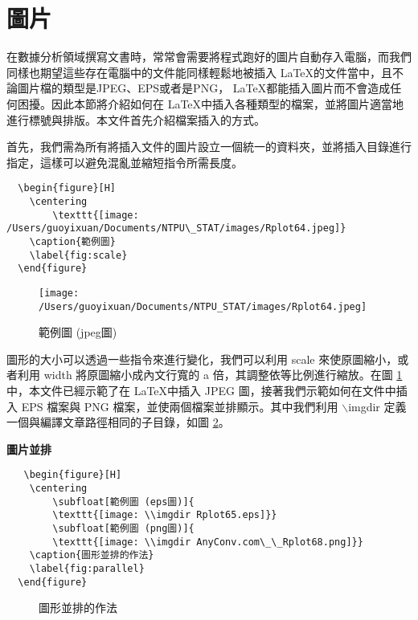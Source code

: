 \section{圖片}

在數據分析領域撰寫文書時，常常會需要將程式跑好的圖片自動存入電腦，而我們同樣也期望這些存在電腦中的文件能同樣輕鬆地被插入 \LaTeX 的文件當中，且不論圖片檔的類型是JPEG、EPS或者是PNG，  \LaTeX 都能插入圖片而不會造成任何困擾。因此本節將介紹如何在 \LaTeX 中插入各種類型的檔案，並將圖片適當地進行標號與排版。本文件首先介紹檔案插入的方式。

首先，我們需為所有將插入文件的圖片設立一個統一的資料夾，並將插入目錄進行指定，這樣可以避免混亂並縮短指令所需長度。

\bigskip
\begin{lstlisting}
  \begin{figure}[H]
    \centering
        \texttt{[image: /Users/guoyixuan/Documents/NTPU\_STAT/images/Rplot64.jpeg]}
    \caption{範例圖}
    \label{fig:scale}
  \end{figure}
\end{lstlisting}

\begin{figure}[H]
    \centering
        \texttt{[image: /Users/guoyixuan/Documents/NTPU\_STAT/images/Rplot64.jpeg]}
    \caption{範例圖 (jpeg圖)}
    \label{fig:scale}
\end{figure}

圖形的大小可以透過一些指令來進行變化，我們可以利用 scale 來使原圖縮小，或者利用 width 將原圖縮小成內文行寬的 a 倍，其調整依等比例進行縮放。在圖 \ref{fig:scale} 中，本文件已經示範了在 \LaTeX 中插入 JPEG 圖，接著我們示範如何在文件中插入 EPS 檔案與 PNG 檔案，並使兩個檔案並排顯示。其中我們利用 {\A $\backslash$imgdir} 定義一個與編譯文章路徑相同的子目錄，如圖 \ref{fig:parallel}。

\textbf{圖片並排}

\bigskip
\begin{lstlisting}
   \begin{figure}[H]
    \centering
        \subfloat[範例圖 (eps圖)]{
        \texttt{[image: \\imgdir Rplot65.eps]}}
        \subfloat[範例圖 (png圖)]{
        \texttt{[image: \\imgdir AnyConv.com\_\_Rplot68.png]}}
    \caption{圖形並排的作法}
    \label{fig:parallel}
  \end{figure}
\end{lstlisting}

\begin{figure}[H]
    \centering
    \caption{圖形並排的作法}
    \label{fig:parallel}
\end{figure}


